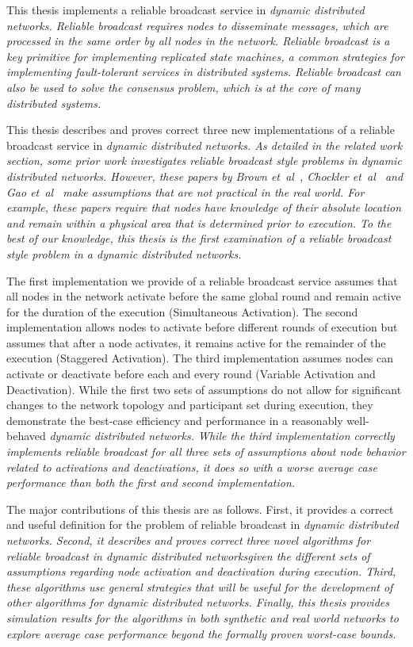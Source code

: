 \documentclass[english]{article}
\begin{document}
This thesis implements a reliable broadcast service in \em dynamic distributed networks\em. Reliable broadcast requires nodes to disseminate messages, which are processed in the same order by all nodes in the network. Reliable broadcast is a key primitive for implementing replicated state machines, a common strategies for implementing fault-tolerant services in distributed systems. Reliable broadcast can also be used to solve the consensus problem, which is at the core of many distributed systems.

This thesis describes and proves correct three new implementations of a reliable broadcast service in \em dynamic distributed networks\em. As detailed in the related work section, some prior work investigates reliable broadcast style problems in \em dynamic distributed networks\em. However, these papers by Brown et~al~\cite{Brown:2007}, Chockler et~al~\cite{Chockler:2008} and Gao et~al~\cite{Gao:2012} make assumptions that are not practical in the real world. For example, these papers require that nodes have knowledge of their absolute location and remain within a physical area that is determined prior to execution. To the best of our knowledge, this thesis is the first examination of a reliable broadcast style problem in a \em dynamic distributed networks\em.

The first implementation we provide of a reliable broadcast service assumes that all nodes in the network activate before the same global round and remain active for the duration of the execution (Simultaneous Activation). The second implementation allows nodes to activate before different rounds of execution but assumes that after a node activates, it remains active for the remainder of the execution (Staggered Activation).  The third implementation assumes nodes can activate or deactivate before each and every round (Variable Activation and Deactivation). While the first two sets of assumptions do not allow for significant changes to the network topology and participant set during execution, they demonstrate the best-case efficiency and performance in a reasonably well-behaved \em dynamic distributed networks\em. While the third implementation correctly implements reliable broadcast for all three sets of assumptions about node behavior related to activations and deactivations, it does so with a worse average case performance than both the first and second implementation. 

The major contributions of this thesis are as follows. First, it provides a correct and useful definition for the problem of reliable broadcast in \em dynamic distributed networks\em. Second, it describes and proves correct three novel algorithms for reliable broadcast in \em dynamic distributed networks\em given the different sets of assumptions regarding node activation and deactivation during execution. Third, these algorithms use general strategies that will be useful for the development of other algorithms for \em dynamic distributed networks\em. Finally, this thesis provides simulation results for the algorithms in both synthetic and real world networks to explore average case performance beyond the formally proven worst-case bounds.
\end{document}
